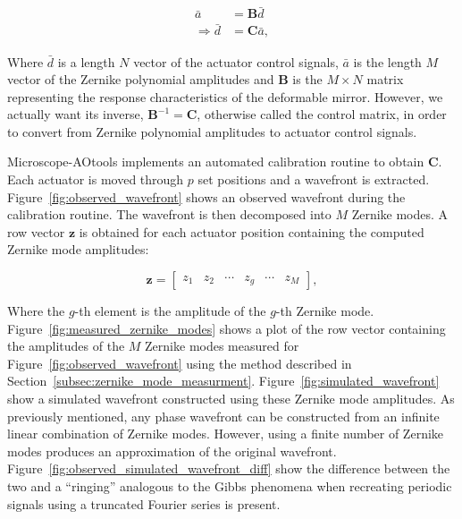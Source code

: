 \begin{equation}\label{eq:CM_derivation}
\begin{split}
\bar{a} &= \boldsymbol{B} \bar{d}\\
\Rightarrow \bar{d} &= \boldsymbol{C} \bar{a},
\end{split}
\end{equation}

Where $\bar{d}$ is a length $N$ vector of the actuator control signals, 
$\bar{a}$ is the length $M$ vector of the Zernike polynomial amplitudes and 
$\boldsymbol{B}$ is the $M \times N$ matrix representing the response 
characteristics of the deformable mirror. However, we actually want its 
inverse, $\boldsymbol{B}^{-1} =\boldsymbol{C}$, otherwise called the control 
matrix, in order to convert from Zernike polynomial amplitudes to actuator 
control signals.

Microscope-AOtools implements an automated calibration routine to obtain 
$\boldsymbol{C}$. Each actuator is moved through $p$ set positions and a 
wavefront is extracted. Figure~\ref{fig:observed_wavefront} shows an 
observed wavefront during the calibration routine. The wavefront is then 
decomposed into $M$ Zernike modes\cite{townson2019aotools}. A row vector 
$\boldsymbol{z}$ is obtained for each actuator position containing the 
computed Zernike mode amplitudes:

\begin{equation}\label{eq:zernike_amp}
\boldsymbol{z} = 
\begin{bmatrix}
z_{1} & z_{2} & \cdots & z_{g} & \cdots & z_{M}
\end{bmatrix},
\end{equation}

Where the $g$-th element is the amplitude of the $g$-th
Zernike mode. Figure~\ref{fig:measured_zernike_modes} shows
a plot of the row vector containing the amplitudes of the 
$M$ Zernike modes measured for Figure~\ref{fig:observed_wavefront} using the 
method described in Section~\ref{subsec:zernike_mode_measurment}.
Figure~\ref{fig:simulated_wavefront} show a simulated wavefront 
constructed using these Zernike mode amplitudes. As previously 
mentioned, any phase wavefront can be constructed from an 
infinite linear combination of Zernike modes\cite{noll1976zernike}. 
However, using a finite number of Zernike modes produces an 
approximation of the original wavefront. 
Figure~\ref{fig:observed_simulated_wavefront_diff} show the
difference between the two and a ``ringing'' analogous to the 
Gibbs phenomena when recreating periodic signals using a
truncated Fourier series is present\cite{weisstein2003gibbs}.

